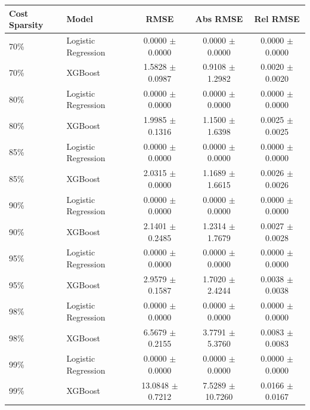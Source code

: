 \begin{tabular}{l l c c c}
\toprule
Cost Sparsity & Model & RMSE & Abs RMSE & Rel RMSE \\
\midrule
70\% & Logistic Regression & 0.0000 $\pm$ 0.0000 & 0.0000 $\pm$ 0.0000 & 0.0000 $\pm$ 0.0000 \\
70\% & XGBoost & 1.5828 $\pm$ 0.0987 & 0.9108 $\pm$ 1.2982 & 0.0020 $\pm$ 0.0020 \\
\midrule
80\% & Logistic Regression & 0.0000 $\pm$ 0.0000 & 0.0000 $\pm$ 0.0000 & 0.0000 $\pm$ 0.0000 \\
80\% & XGBoost & 1.9985 $\pm$ 0.1316 & 1.1500 $\pm$ 1.6398 & 0.0025 $\pm$ 0.0025 \\
\midrule
85\% & Logistic Regression & 0.0000 $\pm$ 0.0000 & 0.0000 $\pm$ 0.0000 & 0.0000 $\pm$ 0.0000 \\
85\% & XGBoost & 2.0315 $\pm$ 0.0000 & 1.1689 $\pm$ 1.6615 & 0.0026 $\pm$ 0.0026 \\
\midrule
90\% & Logistic Regression & 0.0000 $\pm$ 0.0000 & 0.0000 $\pm$ 0.0000 & 0.0000 $\pm$ 0.0000 \\
90\% & XGBoost & 2.1401 $\pm$ 0.2485 & 1.2314 $\pm$ 1.7679 & 0.0027 $\pm$ 0.0028 \\
\midrule
95\% & Logistic Regression & 0.0000 $\pm$ 0.0000 & 0.0000 $\pm$ 0.0000 & 0.0000 $\pm$ 0.0000 \\
95\% & XGBoost & 2.9579 $\pm$ 0.1587 & 1.7020 $\pm$ 2.4244 & 0.0038 $\pm$ 0.0038 \\
\midrule
98\% & Logistic Regression & 0.0000 $\pm$ 0.0000 & 0.0000 $\pm$ 0.0000 & 0.0000 $\pm$ 0.0000 \\
98\% & XGBoost & 6.5679 $\pm$ 0.2155 & 3.7791 $\pm$ 5.3760 & 0.0083 $\pm$ 0.0083 \\
\midrule
99\% & Logistic Regression & 0.0000 $\pm$ 0.0000 & 0.0000 $\pm$ 0.0000 & 0.0000 $\pm$ 0.0000 \\
99\% & XGBoost & 13.0848 $\pm$ 0.7212 & 7.5289 $\pm$ 10.7260 & 0.0166 $\pm$ 0.0167 \\
\bottomrule
\end{tabular}

